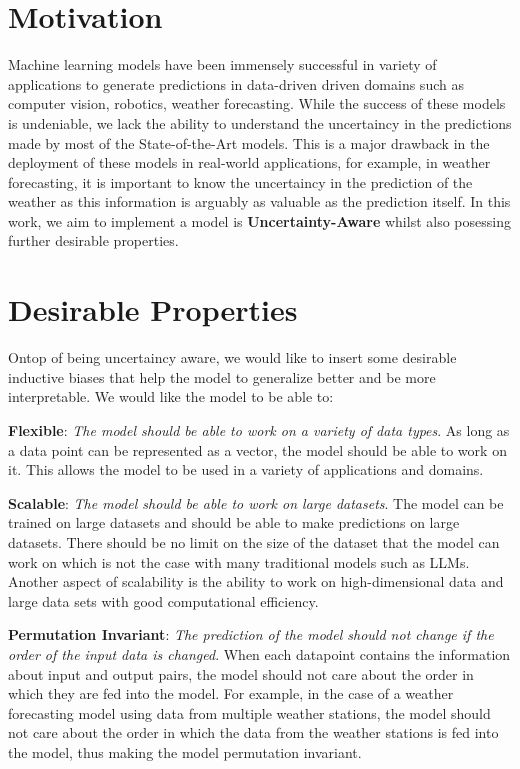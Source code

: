 \documentclass[../../main.tex]{subfiles}
\begin{document}
\section{Motivation}

Machine learning models have been immensely successful in variety of applications to generate predictions in data-driven driven domains such as computer vision, robotics, weather forecasting. While the success of these models is undeniable, we lack the ability to understand the uncertaincy in the predictions made by most of the State-of-the-Art models. This is a major drawback in the deployment of these models in real-world applications, for example, in weather forecasting, it is important to know the uncertaincy in the prediction of the weather as this information is arguably as valuable as the prediction itself. In this work, we aim to implement a model is \textbf{Uncertainty-Aware} whilst also posessing further desirable properties.

\section{Desirable Properties}

Ontop of being uncertaincy aware, we would like to insert some desirable inductive biases that help the model to generalize better and be more interpretable. We would like the model to be able to:

\textbf{Flexible}: \emph{The model should be able to work on a variety of data types}. As long as a data point can be represented as a vector, the model should be able to work on it. This allows the model to be used in a variety of applications and domains.

\textbf{Scalable}: \emph{The model should be able to work on large datasets}. The model can be trained on large datasets and should be able to make predictions on large datasets. There should be no limit on the size of the dataset that the model can work on which is not the case with many traditional models such as LLMs. Another aspect of scalability is the ability to work on high-dimensional data and large data sets with good computational efficiency.


\textbf{Permutation Invariant}: \emph{The prediction of the model should not change if the order of the input data is changed}. When each datapoint contains the information about input and output pairs, the model should not care about the order in which they are fed into the model. For example, in the case of a weather forecasting model using data from multiple weather stations, the model should not care about the order in which the data from the weather stations is fed into the model, thus making the model permutation invariant.
\end{document}

